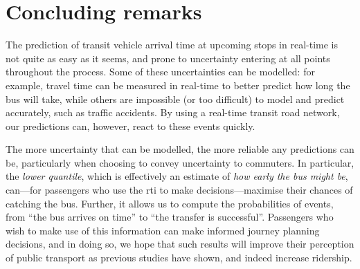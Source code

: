 \section{Concluding remarks}

The prediction of transit vehicle arrival time at upcoming stops in real-time is not quite as easy as it seems, and prone to uncertainty entering at all points throughout the process. Some of these uncertainties can be modelled: for example, travel time can be measured in real-time to better predict how long the bus will take, while others are impossible (or too difficult) to model and predict accurately, such as traffic accidents. By using a real-time transit road network, our predictions can, however, react to these events quickly.


The more uncertainty that can be modelled, the more reliable any predictions can be, particularly when choosing to convey uncertainty to commuters. In particular, the \emph{lower quantile}, which is effectively an estimate of \emph{how early the bus might be}, can---for passengers who use the \gls{rti} to make decisions---maximise their chances of catching the bus. Further, it allows us to compute the probabilities of events, from ``the bus arrives on time'' to ``the transfer is successful''. Passengers who wish to make use of this information can make informed journey planning decisions, and in doing so, we hope that such results will improve their perception of public transport as previous studies have shown, and indeed increase ridership.
